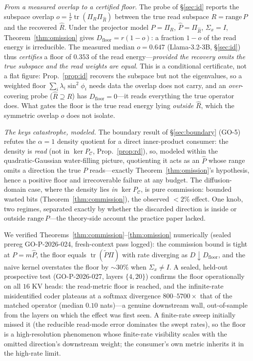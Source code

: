 \documentclass[lettersize,onecolumn]{IEEEtran}
\theoremstyle{definition}
\theoremstyle{remark}
\newcommand{\PC}{P_{\mathcal{C}}}
\newcommand{\tr}{\operatorname{tr}}
\begin{document}
\emph{From a measured overlap to a certified floor.} The probe of \S\ref{sec:id} reports
the subspace overlap $o=\tfrac1r\tr(\Pi_R\Pi_{\hat R})$ between the true read subspace
$R=\mathrm{range}\,P$ and the recovered $\hat R$. Under the projector model $P=\Pi_R$,
$\hat P=\Pi_{\hat R}$, $\Sigma_x=I$, Theorem~\ref{thm:omission} gives
$D_{\mathrm{floor}}=r(1-o)$: a fraction $1-o$ of the read energy is irreducible. The
measured median $o=0.647$ (Llama-3.2-3B, \S\ref{sec:id}) thus \emph{certifies} a floor of
$0.353$ of the read energy---\emph{provided the recovery omits the true subspace and the
read weights are equal}. This is a conditional certificate, not a flat figure:
Prop.~\ref{prop:id} recovers the subspace but not the eigenvalues, so a weighted floor
$\sum_i\lambda_i\sin^2\phi_i$ needs data the overlap does not carry, and an
\emph{over}-covering probe ($\hat R\supseteq R$) has $D_{\mathrm{floor}}=0$---it reads
everything the true operator does. What gates the floor is the true read energy lying
\emph{outside} $\hat R$, which the symmetric overlap $o$ does not isolate.

\emph{The keys catastrophe, modeled.} The boundary result of \S\ref{sec:boundary} (GO-5)
refutes the $\alpha=1$ density quotient for a direct inner-product consumer: the density is
\emph{read} (not in $\ker\PC$, Prop.~\ref{prop:rd}), so, modeled within the
quadratic-Gaussian water-filling picture, quotienting it acts as an $\hat P$ whose range
omits a direction the true $P$ reads---exactly Theorem~\ref{thm:omission}'s hypothesis,
hence a positive floor and irrecoverable failure at any budget. The diffusion-domain case, where the density lies \emph{in} $\ker\PC$, is
pure commission: bounded wasted bits (Theorem~\ref{thm:commission}), the observed $<2\%$
effect. One knob, two regimes, separated exactly by whether the discarded direction is
inside or outside $\mathrm{range}\,P$---the theory-side account the practice paper lacked.

We verified Theorems~\ref{thm:commission}--\ref{thm:omission} numerically (sealed prereg
GO-P-2026-024, fresh-context pass logged): the commission bound is tight at $P=m\hat P$,
the floor equals $\tr(\tilde P\Pi)$ with rate diverging as $D\downarrow
D_{\mathrm{floor}}$, and the naive kernel overstates the floor by ${\sim}30\%$ when
$\Sigma_x\ne I$. A sealed, held-out prospective test (GO-P-2026-027, layers $\{4,20\}$) confirms the floor
operationally on all $16$ KV heads: the read-metric floor is reached, and the infinite-rate
misidentified coder plateaus at a softmax divergence $800$--$5700\times$ that of the matched
operator (median $0.10$ nats)---a genuine downstream wall, out-of-sample from the layers on
which the effect was first seen. A finite-rate sweep initially missed it (the reducible
read-mode error dominates the swept rates), so the floor is a high-resolution phenomenon
whose finite-rate visibility scales with the omitted direction's downstream weight; the
consumer's own metric inherits it in the high-rate limit.
\end{document}
